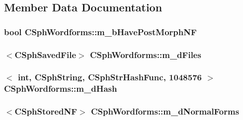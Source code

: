 \subsection{Member Data Documentation}
\hypertarget{structCSphWordforms_a3b1d584e1d49232758eb155fc7543fa0}{
\subsubsection[{m\-\_\-b\-Have\-Post\-Morph\-N\-F}]{\setlength{\rightskip}{0pt plus 5cm}bool C\-Sph\-Wordforms\-::m\-\_\-b\-Have\-Post\-Morph\-N\-F}}\label{structCSphWordforms_a3b1d584e1d49232758eb155fc7543fa0}
\hypertarget{structCSphWordforms_a03a149f24d41183edc2168849bf7e403}{
\subsubsection[{m\-\_\-d\-Files}]{$<${\bf C\-Sph\-Saved\-File}$>$ C\-Sph\-Wordforms\-::m\-\_\-d\-Files}}\label{structCSphWordforms_a03a149f24d41183edc2168849bf7e403}
\hypertarget{structCSphWordforms_a0c10458062525eb7bffa2034531b3a5e}{
\subsubsection[{m\-\_\-d\-Hash}]{$<$ {\bf int}, {\bf C\-Sph\-String}, {\bf C\-Sph\-Str\-Hash\-Func}, 1048576 $>$ C\-Sph\-Wordforms\-::m\-\_\-d\-Hash}}\label{structCSphWordforms_a0c10458062525eb7bffa2034531b3a5e}
\hypertarget{structCSphWordforms_a1284ff1cd78f8be9b7a059ea33c60fc9}{
\subsubsection[{m\-\_\-d\-Normal\-Forms}]{$<${\bf C\-Sph\-Stored\-N\-F}$>$ C\-Sph\-Wordforms\-::m\-\_\-d\-Normal\-Forms}}\label{structCSphWordforms_a1284ff1cd78f8be9b7a059ea33c60fc9}
